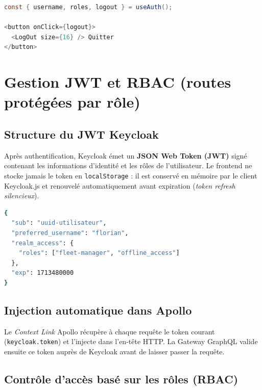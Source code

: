 \documentclass[12pt,a4paper]{article}
\begin{document}
\begin{lstlisting}[language=Java, caption=Utilisation du hook useAuth dans le Layout]
const { username, roles, logout } = useAuth();

<button onClick={logout}>
  <LogOut size={16} /> Quitter
</button>
\end{lstlisting}

\section{Gestion JWT et RBAC (routes prot\'{e}g\'{e}es par r\^{o}le)}

\subsection{Structure du JWT Keycloak}

Apr\`{e}s authentification, Keycloak \'{e}met un \textbf{JSON Web Token (JWT)} sign\'{e} contenant les informations d'identit\'{e} et les r\^{o}les de l'utilisateur. Le frontend ne stocke jamais le token en \texttt{localStorage} : il est conserv\'{e} en m\'{e}moire par le client Keycloak.js et renouvel\'{e} automatiquement avant expiration (\textit{token refresh silencieux}).

\begin{lstlisting}[language=bash, caption=Extrait d'un payload JWT Keycloak d\'{e}cod\'{e}]
{
  "sub": "uuid-utilisateur",
  "preferred_username": "florian",
  "realm_access": {
    "roles": ["fleet-manager", "offline_access"]
  },
  "exp": 1713480000
}
\end{lstlisting}

\subsection{Injection automatique dans Apollo}

Le \textit{Context Link} Apollo r\'{e}cup\`{e}re \`{a} chaque requ\^{e}te le token courant (\texttt{keycloak.token}) et l'injecte dans l'en-t\^{e}te HTTP. La Gateway GraphQL valide ensuite ce token aupr\`{e}s de Keycloak avant de laisser passer la requ\^{e}te.

\subsection{Contr\^{o}le d'acc\`{e}s bas\'{e} sur les r\^{o}les (RBAC)}
\end{document}
